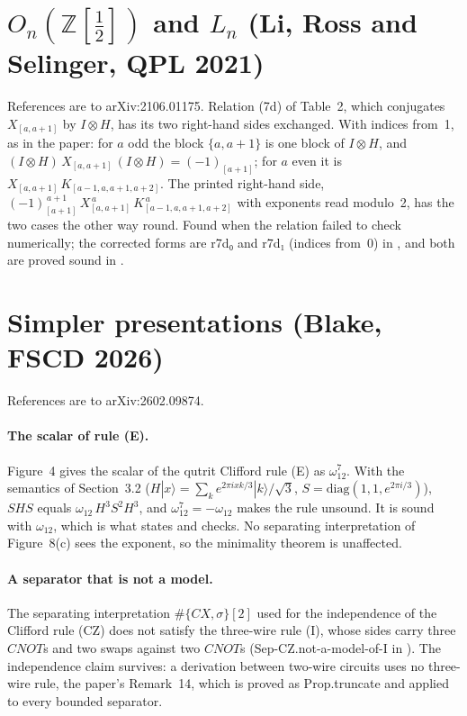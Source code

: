 \documentclass[11pt]{article}
\newcommand{\ket}[1]{|#1\rangle}
\newcommand{\Z}{\mathbb{Z}}
\newcommand{\aid}[1]{\mbox{\textsf{\small #1}}}
\begin{document}
\section{\texorpdfstring{$O_n(\Z[\frac12])$}{On(Z[1/2])} and \texorpdfstring{$L_n$}{Ln} (Li, Ross and Selinger, QPL 2021)}

References are to arXiv:2106.01175. Relation (7d) of Table~2, which
conjugates $X_{[a,a+1]}$ by $I\otimes H$, has its two right-hand sides
exchanged. With indices from~1, as in the paper: for $a$ odd the block
$\{a,a+1\}$ is one block of $I\otimes H$, and
$(I\otimes H)\,X_{[a,a+1]}\,(I\otimes H) = (-1)_{[a+1]}$; for $a$ even
it is $X_{[a,a+1]}\,K_{[a-1,a,a+1,a+2]}$. The printed right-hand side,
$(-1)_{[a+1]}^{\,a+1}\,X_{[a,a+1]}^{\,a}\,K_{[a-1,a,a+1,a+2]}^{\,a}$ with
exponents read modulo~2, has the two cases the other way round. Found
when the relation failed to check numerically; the corrected forms are
\aid{r7d₀} and \aid{r7d₁} (indices from~0) in
, and both are proved sound
in .

\section{Simpler presentations (Blake, FSCD 2026)}

References are to arXiv:2602.09874.

\paragraph{The scalar of rule (E).} Figure~4 gives the scalar of the
qutrit Clifford rule (E) as $\omega_{12}^7$. With the semantics of
Section~3.2 ($H\ket{x} = \sum_k e^{2\pi i xk/3}\ket{k}/\sqrt3$,
$S = \mathrm{diag}(1,1,e^{2\pi i/3})$), $SHS$ equals
$\omega_{12}\,H^3S^2H^3$, and $\omega_{12}^7 = -\omega_{12}$ makes the
rule unsound. It is sound with $\omega_{12}$, which is what
 states and
 checks. No separating
interpretation of Figure~8(c) sees the exponent, so the minimality
theorem is unaffected.

\paragraph{A separator that is not a model.} The separating
interpretation $\#\{CX,\sigma\}[2]$ used for the independence of the
Clifford rule (CZ) does not satisfy the three-wire rule (I), whose
sides carry three $CNOT$s and two swaps against two $CNOT$s
(\aid{Sep-CZ.not-a-model-of-I} in ). The
independence claim survives: a derivation between two-wire circuits
uses no three-wire rule, the paper's Remark~14, which is proved as
\aid{Prop.truncate} and applied to every bounded separator.
\end{document}
